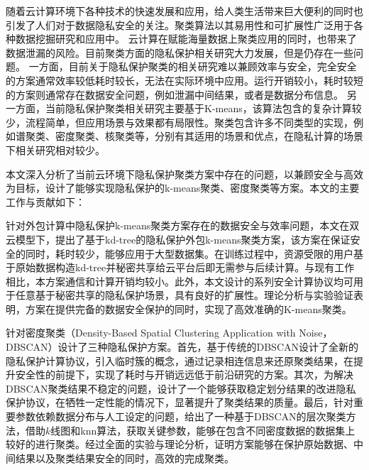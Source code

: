 \begin{cabstract}
随着云计算环境下各种技术的快速发展和应用，给人类生活带来巨大便利的同时也引发了人们对于数据隐私安全的关注。聚类算法以其易用性和可扩展性广泛用于各种数据挖掘研究和应用中。
云计算在赋能海量数据上聚类应用的同时，也带来了数据泄漏的风险。目前聚类方面的隐私保护相关研究大力发展，但是仍存在一些问题。
一方面，目前关于隐私保护聚类的相关研究难以兼顾效率与安全，完全安全的方案通常效率较低耗时较长，无法在实际环境中应用。运行开销较小，耗时较短的方案则通常存在数据安全问题，例如泄漏中间结果，或者是数据分布信息。
另一方面，当前隐私保护聚类相关研究主要基于K-means，该算法包含的复杂计算较少，流程简单，但应用场景与效果都有局限性。聚类包含许多不同类型的实现，例如谱聚类、密度聚类、核聚类等，分别有其适用的场景和优点，在隐私计算的场景下相关研究相对较少。

本文深入分析了当前云环境下隐私保护聚类方案中存在的问题，以兼顾安全与高效为目标，设计了能够实现隐私保护的k-means聚类、密度聚类等方案。本文的主要工作与贡献如下：
\begin{compactenum}
\item 针对外包计算中隐私保护k-means聚类方案存在的数据安全与效率问题，本文在双云模型下，提出了基于kd-tree的隐私保护外包k-means聚类方案，该方案在保证安全的同时，耗时较少，能够应用于大型数据集。在训练过程中，资源受限的用户基于原始数据构造kd-tree并秘密共享给云平台后即无需参与后续计算。与现有工作相比，本方案通信和计算开销均较小。此外，本文设计的系列安全计算协议均可用于任意基于秘密共享的隐私保护场景，具有良好的扩展性。理论分析与实验验证表明，方案在提供完备的数据安全保护的同时，实现了高效准确的K-means聚类。

\item 针对密度聚类（Density-Based Spatial Clustering Application with Noise，DBSCAN）设计了三种隐私保护方案。首先，基于传统的DBSCAN设计了全新的隐私保护计算协议，引入临时簇的概念，通过记录相连信息来还原聚类结果，在提升安全性的前提下，实现了耗时与开销远远低于前沿研究的方案。其次，为解决DBSCAN聚类结果不稳定的问题，设计了一个能够获取稳定划分结果的改进隐私保护协议，在牺牲一定性能的情况下，显著提升了聚类结果的质量。最后，针对重要参数依赖数据分布与人工设定的问题，给出了一种基于DBSCAN的层次聚类方法，借助$ k $线图和knn算法，获取关键参数，能够在包含不同密度数据的数据集上较好的进行聚类。经过全面的实验与理论分析，证明方案能够在保护原始数据、中间结果以及聚类结果安全的同时，高效的完成聚类。   
\end{compactenum}                                               
\end{cabstract}

